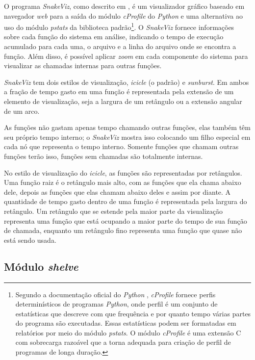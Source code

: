 \documentclass[12pt]{article}
\begin{document}
O programa \textit{SnakeViz}, como descrito em \cite{SnakeViz:2022}, é um visualizador gráfico baseado em navegador \textit{web} para a saída do módulo \textit{cProfile} do \textit{Python} e uma alternativa ao uso do módulo \textit{pstats} da biblioteca padrão\footnote{Segundo a documentação oficial do \textit{Python} \cite{python:2022}, \textit{cProfile} fornece perfis determinísticos de programas \textit{Python}, onde perfil é um conjunto de estatísticas que descreve com que frequência e por quanto tempo várias partes do programa são executadas. Essas estatísticas podem ser formatadas em relatórios por meio do módulo \textit{pstats}. O módulo \textit{cProfile} é uma extensão C com sobrecarga razoável que a torna adequada para criação de perfil de programas de longa duração.}. O \textit{SnakeViz} fornece informações sobre cada função do sistema em análise, indicando o tempo de execução acumulado para cada uma, o arquivo e a linha do arquivo onde se encontra a função. Além disso, é possível aplicar \textit{zoom} em cada componente do sistema para visualizar as chamadas internas para outras funções.

\textit{SnakeViz} tem dois estilos de visualização, \textit{icicle} (o padrão) e \textit{sunburst}. Em ambos a fração de tempo gasto em uma função é representada pela extensão de um elemento de visualização, seja a largura de um retângulo ou a extensão angular de um arco.

As funções não gastam apenas tempo chamando outras funções, elas também têm seu próprio tempo interno; o \textit{SnakeViz} mostra isso colocando um filho especial em cada nó que representa o tempo interno. Somente funções que chamam outras funções terão isso, funções sem chamadas são totalmente internas.

No estilo de visualização do \textit{icicle}, as funções são representadas por retângulos. Uma função raiz é o retângulo mais alto, com as funções que ela chama abaixo dele, depois as funções que elas chamam abaixo deles e assim por diante. A quantidade de tempo gasto dentro de uma função é representada pela largura do retângulo. Um retângulo que se estende pela maior parte da visualização representa uma função que está ocupando a maior parte do tempo de sua função de chamada, enquanto um retângulo fino representa uma função que quase não está sendo usada.

\subsection{Módulo \textit{shelve}}
\label{shelve}
\end{document}
